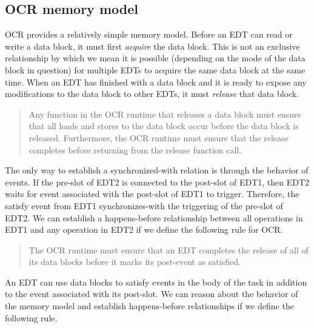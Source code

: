 \subsection{OCR memory model}
OCR provides a relatively simple memory model. Before an EDT can read
or write a data block, it must first \emph{acquire} the data
block. This is not an exclusive relationship by which we mean it is
possible (depending on the mode of the data block in question) for
multiple EDTs to acquire the same data block at the same
time. When an EDT has finished with a data block and it is ready
to expose any modifications to the data block to other EDTs, it
must \emph{release} that data block.

\begin{quote}
Any function in the OCR runtime that releases a data block must ensure
that all loads and stores to the data block occur before the data
block is released. Furthermore, the OCR runtime must ensure that the
release completes before returning from the release function call.
\end{quote}

The only way to establish a synchronized-with relation is through the
behavior of events. If the pre-slot of EDT2 is connected to the post-slot
of EDT1, then EDT2 waits for event associated with the post-slot of EDT1 to
trigger. Therefore, the satisfy event from EDT1 synchronizes-with the
triggering of the pre-slot of EDT2. We can establish a happens-before
relationship between all operations in EDT1 and any operation in EDT2
if we define the following rule for OCR.

\begin{quote}
The OCR runtime must ensure that an EDT completes the release of all
of its data blocks before it marks its post-event as satisfied.
\end{quote}

An EDT can use data blocks to satisfy events in the body of the task
in addition to the event associated with its post-slot. We can reason
about the behavior of the memory model and establish happens-before
relationships if we define the following rule.

